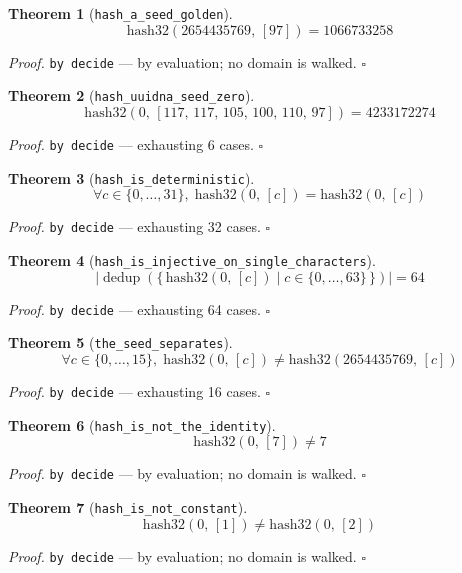 \documentclass[11pt]{article}
\newtheorem{theorem}{Theorem}[section]
\begin{document}
\begin{theorem}[\texttt{hash\_a\_seed\_golden}]
\[ \mathrm{hash32}\mathopen{}\left(2654435769,\,[97]\right) = 1066733258 \]
\end{theorem}
\noindent\emph{Proof.} \texttt{by decide} --- by evaluation; no domain is walked. \hfill$\square$

\begin{theorem}[\texttt{hash\_uuidna\_seed\_zero}]
\[ \mathrm{hash32}\mathopen{}\left(0,\,[117,\,117,\,105,\,100,\,110,\,97]\right) = 4233172274 \]
\end{theorem}
\noindent\emph{Proof.} \texttt{by decide} --- exhausting 6 cases. \hfill$\square$

\begin{theorem}[\texttt{hash\_is\_deterministic}]
\[ \forall c \in \{0,\dots,31\},\; \mathrm{hash32}\mathopen{}\left(0,\,[c]\right) = \mathrm{hash32}\mathopen{}\left(0,\,[c]\right) \]
\end{theorem}
\noindent\emph{Proof.} \texttt{by decide} --- exhausting 32 cases. \hfill$\square$

\begin{theorem}[\texttt{hash\_is\_injective\_on\_single\_characters}]
\[ \left|\operatorname{dedup}\left(\{\, \mathrm{hash32}\mathopen{}\left(0,\,[c]\right) \mid c \in \{0,\dots,63\} \,\}\right)\right| = 64 \]
\end{theorem}
\noindent\emph{Proof.} \texttt{by decide} --- exhausting 64 cases. \hfill$\square$

\begin{theorem}[\texttt{the\_seed\_separates}]
\[ \forall c \in \{0,\dots,15\},\; \mathrm{hash32}\mathopen{}\left(0,\,[c]\right) \neq \mathrm{hash32}\mathopen{}\left(2654435769,\,[c]\right) \]
\end{theorem}
\noindent\emph{Proof.} \texttt{by decide} --- exhausting 16 cases. \hfill$\square$

\begin{theorem}[\texttt{hash\_is\_not\_the\_identity}]
\[ \mathrm{hash32}\mathopen{}\left(0,\,[7]\right) \neq 7 \]
\end{theorem}
\noindent\emph{Proof.} \texttt{by decide} --- by evaluation; no domain is walked. \hfill$\square$

\begin{theorem}[\texttt{hash\_is\_not\_constant}]
\[ \mathrm{hash32}\mathopen{}\left(0,\,[1]\right) \neq \mathrm{hash32}\mathopen{}\left(0,\,[2]\right) \]
\end{theorem}
\noindent\emph{Proof.} \texttt{by decide} --- by evaluation; no domain is walked. \hfill$\square$
\end{document}
